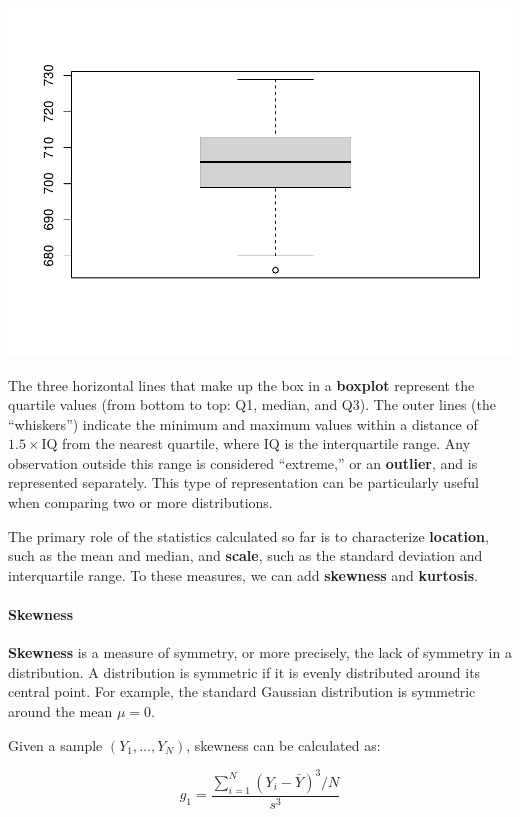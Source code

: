 \documentclass[
]{article}
\begin{document}
\includegraphics{EDA_files/figure-latex/unnamed-chunk-22-1.pdf}

The three horizontal lines that make up the box in a \textbf{boxplot}
represent the quartile values (from bottom to top: Q1, median, and Q3).
The outer lines (the ``whiskers'') indicate the minimum and maximum
values within a distance of \(1.5 \times \text{IQ}\) from the nearest
quartile, where \(\text{IQ}\) is the interquartile range. Any
observation outside this range is considered ``extreme,'' or an
\textbf{outlier}, and is represented separately. This type of
representation can be particularly useful when comparing two or more
distributions.

The primary role of the statistics calculated so far is to characterize
\textbf{location}, such as the mean and median, and \textbf{scale}, such
as the standard deviation and interquartile range. To these measures, we
can add \textbf{skewness} and \textbf{kurtosis}.

\hypertarget{skewness}{%
\paragraph{Skewness}\label{skewness}}

\textbf{Skewness} is a measure of symmetry, or more precisely, the lack
of symmetry in a distribution. A distribution is symmetric if it is
evenly distributed around its central point. For example, the standard
Gaussian distribution is symmetric around the mean \(\mu = 0\).

Given a sample \((Y_1, \ldots, Y_N)\), skewness can be calculated as:

\[
g_1 = \frac{\sum_{i=1}^N (Y_i - \bar{Y})^3 / N}{s^3}
\]
\end{document}
